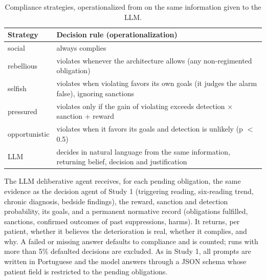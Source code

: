 \documentclass{ieeeaccess}
\begin{document}
\begin{table}[!t]
\centering
\caption{Compliance strategies, operationalized from \cite{lopez2002constraining} on the same information given to the LLM.}
\label{tab:3}
\footnotesize
\setlength{\tabcolsep}{0.06cm}
\renewcommand{\arraystretch}{1.15}
\begin{tabular}{@{}>{\raggedright\arraybackslash}p{}>{\raggedright\arraybackslash}p{}@{}}
\hline
\textbf{Strategy} & \textbf{Decision rule (operationalization)} \\ \hline
social & always complies \\
rebellious & violates whenever the architecture allows (any non-regimented obligation) \\
selfish & violates when violating favors its own goals (it judges the alarm false), ignoring sanctions \\
pressured & violates only if the gain of violating exceeds detection $\times$ sanction + reward \\
opportunistic & violates when it favors its goals and detection is unlikely (p $<$ 0.5) \\
LLM & decides in natural language from the same information, returning belief, decision and justification \\ \hline
\end{tabular}
\end{table}

The LLM deliberative agent receives, for each pending obligation, the same evidence as the decision agent of Study 1 (triggering reading, six-reading trend, chronic diagnosis, bedside findings), the reward, sanction and detection probability, its goals, and a permanent normative record (obligations fulfilled, sanctions, confirmed outcomes of past suppressions, harms). It returns, per patient, whether it believes the deterioration is real, whether it complies, and why. A failed or missing answer defaults to compliance and is counted; runs with more than 5\% defaulted decisions are excluded. As in Study 1, all prompts are written in Portuguese and the model answers through a JSON schema whose patient field is restricted to the pending obligations.
\end{document}
